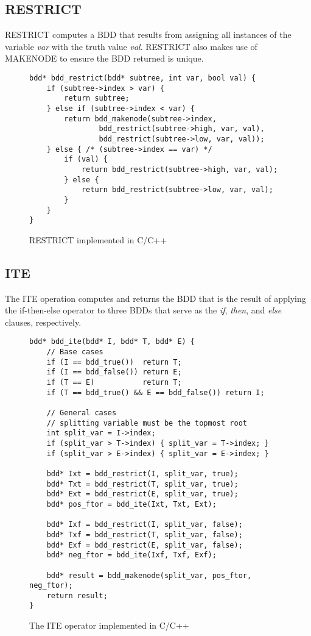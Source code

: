 \documentclass[12pt]{article}
\begin{document}
\subsection{RESTRICT}
RESTRICT computes a BDD that results from assigning all instances of the variable \textit{var} with the truth value \textit{val}. 
RESTRICT also makes use of MAKENODE to ensure the BDD returned is unique.

\begin{figure}[h!]
\begin{lstlisting}
bdd* bdd_restrict(bdd* subtree, int var, bool val) {
    if (subtree->index > var) {
        return subtree;
    } else if (subtree->index < var) {
        return bdd_makenode(subtree->index,
                bdd_restrict(subtree->high, var, val),
                bdd_restrict(subtree->low, var, val));
    } else { /* (subtree->index == var) */
        if (val) {
            return bdd_restrict(subtree->high, var, val);
        } else {
            return bdd_restrict(subtree->low, var, val);
        }
    }
}
\end{lstlisting}
\caption{RESTRICT implemented in C/C++}
\end{figure}

\subsection{ITE}
The ITE operation computes and returns the BDD that is the result of applying the if-then-else operator to three BDDs that serve as the \textit{if}, \textit{then}, and \textit{else} clauses, respectively. 
\begin{figure}[h!]
\begin{lstlisting}
bdd* bdd_ite(bdd* I, bdd* T, bdd* E) {
    // Base cases
    if (I == bdd_true())  return T;
    if (I == bdd_false()) return E;
    if (T == E)           return T;
    if (T == bdd_true() && E == bdd_false()) return I;

    // General cases
    // splitting variable must be the topmost root
    int split_var = I->index;
    if (split_var > T->index) { split_var = T->index; }
    if (split_var > E->index) { split_var = E->index; }
    
    bdd* Ixt = bdd_restrict(I, split_var, true);
    bdd* Txt = bdd_restrict(T, split_var, true);
    bdd* Ext = bdd_restrict(E, split_var, true);
    bdd* pos_ftor = bdd_ite(Ixt, Txt, Ext);
    
    bdd* Ixf = bdd_restrict(I, split_var, false);
    bdd* Txf = bdd_restrict(T, split_var, false);
    bdd* Exf = bdd_restrict(E, split_var, false);
    bdd* neg_ftor = bdd_ite(Ixf, Txf, Exf);
    
    bdd* result = bdd_makenode(split_var, pos_ftor, neg_ftor);
    return result;
}
\end{lstlisting}
\caption{The ITE operator implemented in C/C++}
\end{figure}
\end{document}
